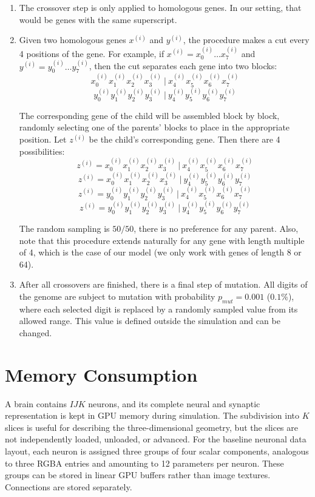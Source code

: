 \documentclass[12pt,a4paper]{article}
\begin{document}
	\begin{enumerate}
		\item The crossover step is only applied to homologous genes. In our setting, that would be genes with the same superscript.
		\item Given two homologous genes $x^{(i)}$ and $y^{(i)}$, the procedure makes a cut every 4 positions of the gene. For example, if $x^{(i)} = x_0^{(i)} \ldots x_7^{(i)}$ and $y^{(i)} = y_0^{(i)} \ldots y_7^{(i)}$, then the cut separates each gene into two blocks:
		$$x_0^{(i)} x_1^{(i)} x_2^{(i)} x_3^{(i)} \ | \ x_4^{(i)} x_5^{(i)} x_6^{(i)} x_7^{(i)}$$
		$$y_0^{(i)} y_1^{(i)} y_2^{(i)} y_3^{(i)} \ | \ y_4^{(i)} y_5^{(i)} y_6^{(i)} y_7^{(i)}$$
		
		The corresponding gene of the child will be assembled block by block, randomly selecting one of the parents' blocks to place in the appropriate position. Let $z^{(i)}$ be the child's corresponding gene. Then there are 4 possibilities:
		 $$z^{(i)} = x_0^{(i)} x_1^{(i)} x_2^{(i)} x_3^{(i)} \ | \ x_4^{(i)} x_5^{(i)} x_6^{(i)} x_7^{(i)}$$
		 $$z^{(i)} = x_0^{(i)} x_1^{(i)} x_2^{(i)} x_3^{(i)} \ | \ y_4^{(i)} y_5^{(i)} y_6^{(i)} y_7^{(i)}$$
		 $$z^{(i)} = y_0^{(i)} y_1^{(i)} y_2^{(i)} y_3^{(i)} \ | \ x_4^{(i)} x_5^{(i)} x_6^{(i)} x_7^{(i)}$$
		 $$z^{(i)} = y_0^{(i)} y_1^{(i)} y_2^{(i)} y_3^{(i)} \ | \ y_4^{(i)} y_5^{(i)} y_6^{(i)} y_7^{(i)}$$
		 
		 The random sampling is $50/50$, there is no preference for any parent. Also, note that this procedure extends naturally for any gene with length multiple of 4, which is the case of our model (we only work with genes of length 8 or 64).
		 \item After all crossovers are finished, there is a final step of mutation. All digits of the genome are subject to mutation with probability $p_{mut} = 0.001$ ($0.1\%$), where each selected digit is replaced by a randomly sampled value from its allowed range. This value is defined outside the simulation and can be changed.
	\end{enumerate}
	
\section{Memory Consumption}

	A brain contains $IJK$ neurons, and its complete neural and synaptic representation is kept in GPU memory during simulation. The subdivision into $K$ slices is useful for describing the three-dimensional geometry, but the slices are not independently loaded, unloaded, or advanced. For the baseline neuronal data layout, each neuron is assigned three groups of four scalar components, analogous to three RGBA entries and amounting to 12 parameters per neuron. These groups can be stored in linear GPU buffers rather than image textures. Connections are stored separately.
\end{document}
